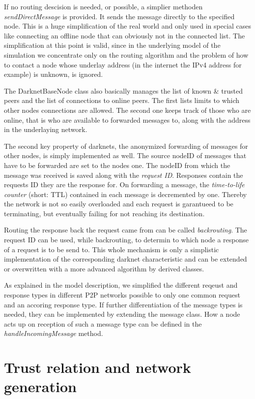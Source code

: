 If no routing descision is needed, or possible, a simplier methoden \emph{sendDirectMessage} is provided. It sends the message directly to the specified node. This is a huge simplification of the real world and only used in special cases like connecting an offline node that can obviously not in the connected list. The simplification at this point is valid, since in the underlying model of the simulation we concentrate only on the routing algorithm and the problem of how to contact a node whose underlay address (in the internet the IPv4 address for example) is unknown, is ignored.

The DarknetBaseNode class also basically manages the list of known & trusted peers and the list of connections to online peers. The first lists limits to which other nodes connections are allowed. The second one keeps track of those who are online, that is who are available to forwarded messages to, along with the address in the underlaying network.

The second key property of darknets, the anonymized forwarding of messages for other nodes, is simply implemented as well. The source nodeID of messages that have to be forwarded are set to the nodes one. The nodeID from which the message was received is saved along with the \emph{request ID}. Responses contain the requests ID they are the response for. On forwarding a message, the \emph{time-to-life counter} (short: TTL) contained in each message is decremented by one. Thereby the network is not so easily overloaded and each request is garantueed to be terminating, but eventually failing for not reaching its destination.

Routing the response back the request came from can be called \emph{backrouting}. The request ID can be used, while backrouting, to determin to which node a response of a request is to be send to. This whole mechanism is only a simplistic implementation of the corresponding darknet characteristic and can be extended or overwritten with a more advanced algorithm by derived classes.

As explained in the model description, we simplified the different reqeust and response types in different P2P networks possible to only one common request and an accoring response type. If further differentiation of the message types is needed, they can be implemented by extending the message class. How a node acts up on reception of such a message type can be defined in the \emph{handleIncomingMessage} method.

\section{Trust relation and network generation}

